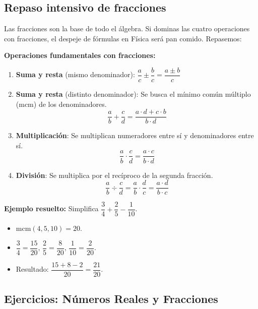 \documentclass[12pt, a4paper]{article}
\begin{document}
\subsection{Repaso intensivo de fracciones}

Las fracciones son la base de todo el álgebra. Si dominas las cuatro operaciones con fracciones, el despeje de fórmulas en Física será pan comido. Repasemos:

\begin{cuadrosolucion}
\textbf{Operaciones fundamentales con fracciones:}
\begin{enumerate}[leftmargin=*, label=\arabic*.]
  \item \textbf{Suma y resta} (mismo denominador): $\dfrac{a}{c} \pm \dfrac{b}{c} = \dfrac{a \pm b}{c}$
  
  \item \textbf{Suma y resta} (distinto denominador): Se busca el mínimo común múltiplo (mcm) de los denominadores.
  $$\frac{a}{b} + \frac{c}{d} = \frac{a \cdot d + c \cdot b}{b \cdot d}$$
  
  \item \textbf{Multiplicación}: Se multiplican numeradores entre sí y denominadores entre sí.
  $$\frac{a}{b} \cdot \frac{c}{d} = \frac{a \cdot c}{b \cdot d}$$
  
  \item \textbf{División}: Se multiplica por el recíproco de la segunda fracción.
  $$\frac{a}{b} \div \frac{c}{d} = \frac{a}{b} \cdot \frac{d}{c} = \frac{a \cdot d}{b \cdot c}$$
\end{enumerate}
\end{cuadrosolucion}

\noindent\textbf{Ejemplo resuelto:} Simplifica $\dfrac{3}{4} + \dfrac{2}{5} - \dfrac{1}{10}$.
\begin{itemize}
  \item mcm$(4, 5, 10) = 20$.
  \item $\dfrac{3}{4} = \dfrac{15}{20}$, \quad $\dfrac{2}{5} = \dfrac{8}{20}$, \quad $\dfrac{1}{10} = \dfrac{2}{20}$.
  \item Resultado: $\dfrac{15 + 8 - 2}{20} = \dfrac{21}{20}$.
\end{itemize}

\newpage

\subsection{Ejercicios: Números Reales y Fracciones}
\end{document}
